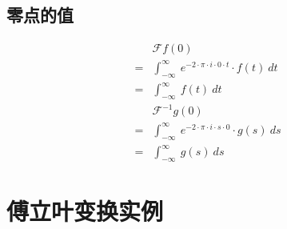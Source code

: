 \subsection{零点的值}
\begin{align*}
	  & \mathcal{F}f(0)                                                             \\
	= & \int_{-\infty}^{\infty}\ e^{-2\cdot \pi\cdot i\cdot 0\cdot t}\cdot f(t)\ dt \\
	= & \int_{-\infty}^{\infty}\ f(t)\ dt                                           \\
	  & \mathcal{F}^{-1}g(0)                                                        \\
	= & \int_{-\infty}^{\infty}\ e^{-2\cdot \pi\cdot i\cdot s\cdot 0}\cdot g(s)\ ds \\
	= & \int_{-\infty}^{\infty}\ g(s)\ ds
\end{align*}
\section{傅立叶变换实例}
